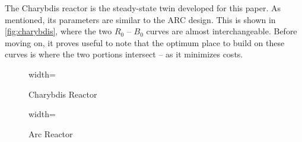 The Charybdis reactor is the steady-state twin developed for this paper. As mentioned, its parameters are similar to the ARC design. This is shown in \cref{fig:charybdis}, where the two $R_0$ -- $B_0$ curves are almost interchangeable. Before moving on, it proves useful to note that the optimum place to build on these curves is where the two portions intersect -- as it minimizes costs.

\begin{figure*}[h!]
    \centering
    \hfill 
    \begin{subfigure}[t]{0.45\textwidth}
        \centering
    \begin{adjustbox}{width=\textwidth}
      \Large
      
    \end{adjustbox}
        \caption{Charybdis Reactor}
    \end{subfigure}
    \hfill
    \begin{subfigure}[t]{0.45\textwidth}
        \centering
    \begin{adjustbox}{width=\textwidth}
      \Large
      
    \end{adjustbox}
        \caption{Arc Reactor}
    \end{subfigure}
    \hfill \hfill ~\\ ~\\ ~\\
    \caption{Steady State Prototype Comparison} ~\\
    \label{fig:charybdis}
\end{figure*}

